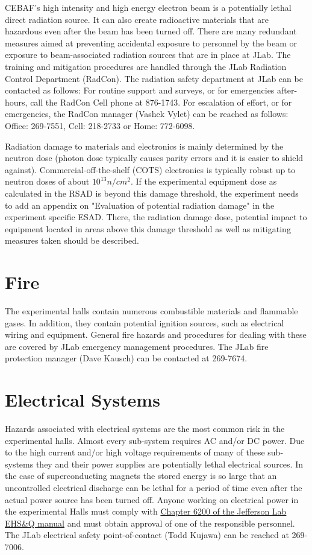 \documentclass[11pt]{report}
\begin{document}
CEBAF's high intensity and high energy electron beam is a potentially lethal direct radiation source. 
It can also create radioactive materials that are hazardous even  after the beam has been turned off. 
There are many redundant measures aimed at preventing accidental exposure to personnel by the beam 
or exposure to beam-associated radiation sources that are in place at JLab. The training and mitigation 
procedures are handled through the JLab Radiation Control Department (RadCon). The radiation safety 
department at JLab can be contacted as follows: For routine support and surveys, or for emergencies 
after-hours, call the RadCon Cell phone at 876-1743. For escalation of effort, or for emergencies, 
the RadCon manager (Vashek Vylet) can be reached as follows: Office: 269-7551, Cell: 218-2733 or Home: 772-6098.

Radiation damage to materials and electronics is mainly determined by the neutron 
dose (photon dose typically causes parity errors and it is easier to shield against). 
Commercial-off-the-shelf (COTS) electronics is typically robust up to neutron 
doses of about $10^{13} n/cm^2$. If the experimental equipment dose as calculated 
in the RSAD is beyond this damage threshold, the experiment needs to add 
an appendix on "Evaluation of potential radiation damage" in the experiment 
specific ESAD. There, the radiation damage dose, potential impact to equipment 
located in areas above this damage threshold as well as mitigating measures taken should be described.

\section{Fire}

	The experimental halls contain numerous combustible materials and flammable gases. 
In addition, they contain potential ignition sources, such as electrical wiring and equipment. 
General fire hazards and procedures for dealing with these are covered by JLab emergency 
management procedures. The JLab fire protection manager (Dave Kausch) can be contacted at 269-7674.

\section{Electrical Systems}

	Hazards associated with electrical systems are the most common risk in the experimental halls. 
Almost every sub-system requires AC and/or DC power. Due to the high current and/or high voltage 
requirements of many of these sub-systems they and their power supplies are potentially lethal 
electrical sources. In the case of superconducting magnets the stored energy is so large that 
an uncontrolled electrical discharge can be lethal for a period of time even after the actual 
power source has been turned off.  Anyone working on electrical power in the experimental Halls 
must comply with \href{http://www.jlab.org/ehs/ehsmanual/manual/6200.html}{Chapter 6200 of the Jefferson Lab EHS\&Q manual}
and must obtain approval of one of the responsible personnel. 
The JLab electrical safety point-of-contact (Todd Kujawa) can be reached at 269-7006.
\end{document}
